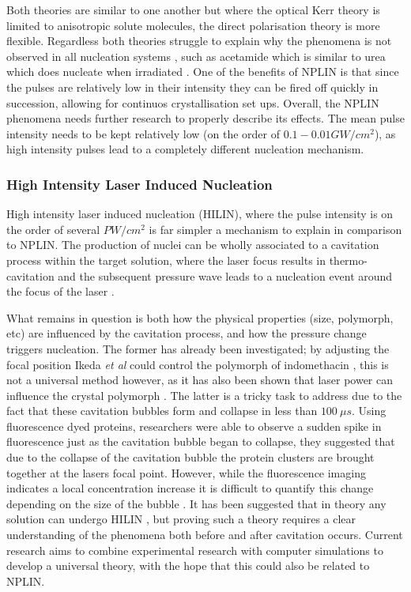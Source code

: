 Both theories are similar to one another but where the optical 
Kerr theory is limited to anisotropic solute molecules, the 
direct polarisation theory is more flexible. Regardless both 
theories struggle to explain why the phenomena is not observed 
in all nucleation systems \cite{Korede2023}, such as acetamide 
which is similar to urea which does nucleate when irradiated 
\cite{Ward2016}. One of the benefits of NPLIN is that since the 
pulses are relatively low in their intensity they can be fired 
off quickly in succession, allowing for continuos crystallisation 
set ups. Overall, the NPLIN phenomena needs further research to 
properly describe its effects. The mean pulse intensity needs to 
be kept relatively low (on the order of $0.1-0.01 GW/cm^2$), as 
high intensity pulses lead to a completely different nucleation 
mechanism.

\subsubsection{High Intensity Laser Induced Nucleation}
High intensity laser induced nucleation (HILIN), where the pulse 
intensity is on the order of several $PW/cm^2$ is far simpler a 
mechanism to explain in comparison to NPLIN. The production of 
nuclei can be wholly associated to a cavitation process within 
the target solution, where the laser focus results in thermo-
cavitation and the subsequent pressure wave leads to a nucleation 
event around the focus of the laser \cite{Yoshikawa2005, Soare2011, 
Barber2019}. 

What remains in question is both how the physical properties (size, 
polymorph, etc) are influenced by the cavitation process, and how 
the pressure change triggers nucleation. The former has already 
been investigated; by adjusting the focal position Ikeda \textit{et 
al} could control the polymorph of indomethacin \cite{Ikeda2015}, 
this is not a universal method however, as it has also been shown 
that laser power can influence the crystal polymorph \cite{Wang2010}. 
The latter is a tricky task to address due to the fact that these 
cavitation bubbles form and collapse in less than $100\ \mu s$. 
Using fluorescence dyed proteins, researchers were able to observe 
a sudden spike in fluorescence just as the cavitation bubble began 
to collapse, they suggested that due to the collapse of the cavitation 
bubble the protein clusters are brought together at the lasers focal 
point. However, while the fluorescence imaging indicates a local 
concentration increase it is difficult to quantify this change 
depending on the size of the bubble \cite{Korede2023}. It has been 
suggested that in theory any solution can undergo HILIN 
\cite{Korede2023}, but proving such a theory requires a clear 
understanding of the phenomena both before and after cavitation occurs. 
Current research aims to combine experimental research with computer 
simulations to develop a universal theory, with the hope that this 
could also be related to NPLIN.   

